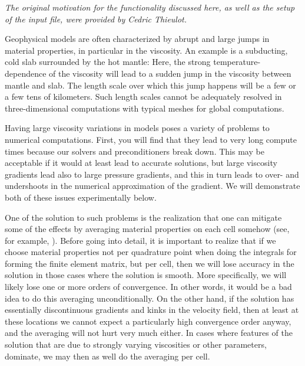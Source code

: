 \documentclass{article}
\begin{document}
\textit{The original motivation for the functionality discussed here, as well
  as the setup of the input file, were provided by Cedric Thieulot.}

Geophysical models are often characterized by abrupt and large jumps in material
properties, in particular in the viscosity. An example is a subducting, cold
slab surrounded by the hot mantle: Here, the strong
temperature-dependence of the viscosity will lead to a sudden jump in the
viscosity between mantle and slab. The length scale over which this jump happens
will be a few or a few tens of kilometers. Such length scales cannot be
adequately resolved in three-dimensional computations with typical meshes for
global computations.

Having large viscosity variations in models poses a variety of problems to
numerical computations. First, you will find that they lead to very long compute
times because our solvers and preconditioners break down. This may be
acceptable if it would at least lead to accurate solutions, but large viscosity
gradients lead also to large pressure gradients, and this in turn leads to over-
and undershoots in the numerical approximation of the gradient. We will 
demonstrate both of these issues experimentally below.

One of the solution to such problems is the realization that one can mitigate
some of the effects by averaging material properties on each cell somehow
(see, for example, \cite{Bab08,Deu08,DMGT11,Thi15,TMK14}).
Before going into detail, it is important to realize that if we choose material
properties not per quadrature point when doing the integrals for forming the
finite element matrix, but per cell, then we will lose accuracy in the solution
in those cases where the solution is smooth. More specifically, we will likely
lose one or more orders of convergence. In other words, it would be a bad idea
to do this averaging unconditionally. On the other hand, if the solution has
essentially discontinuous gradients and kinks in the velocity field, then at
least at these locations we cannot expect a particularly high convergence order
anyway, and the averaging will not hurt very much either. In cases where
features of the solution that are due to strongly varying viscosities or other
parameters, dominate, we may then as well do the averaging per cell.
\end{document}
